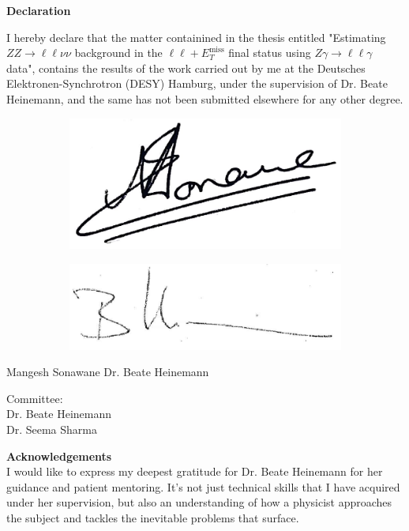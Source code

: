 \documentclass[12pt,a4paper,openright,twoside]{report}
\newcommand{\ZZ}{$ZZ\to \ell\ell\nu\nu$ }
\newcommand{\Zg}{$Z\gamma\to \ell\ell\gamma$ }
\newcommand{\llM}{$\ell\ell+E_T^{\mathrm{miss}}$ }
\newcommand\blankpage{%
    \null
    \thispagestyle{empty}%
    \addtocounter{page}{-1}%
    \newpage}
\begin{document}
\newpage
\blankpage
\newpage
\begin{center}
\Huge \textbf{Declaration\\}
\end{center}
\vspace{1cm}
\normalsize I hereby declare that the matter containined in the thesis entitled "Estimating \ZZ background in the \llM final status using \Zg data", contains the results of the work carried out by me at the Deutsches Elektronen-Synchrotron (DESY) Hamburg, under the supervision of Dr. Beate Heinemann, and the same has not been submitted elsewhere for any other degree.
\vfill
\begin{figure}[H]
	\hspace{1cm}
	\begin{subfigure}{0.49\textwidth}
	\includegraphics[width=0.4\linewidth]{sign.jpg}
	\end{subfigure}\hspace{1cm}
	\begin{subfigure}{0.49\textwidth}
	\centering
	\includegraphics[width=0.7\linewidth]{Beate_sign.jpg}
	\end{subfigure}
\end{figure}
\begin{center}
Mangesh Sonawane\hspace{8cm}
Dr. Beate Heinemann
\end{center}
\vfill
Committee:\\
Dr. Beate Heinemann\\
Dr. Seema Sharma
\vfill
\vfill
\newpage
\blankpage
\newpage
{\Huge \textbf{Acknowledgements\vspace{2cm}\\}}
I would like to express my deepest gratitude for Dr. Beate Heinemann for her guidance and patient mentoring. It's not just technical skills that I have acquired under her supervision, but also an understanding of how a physicist approaches the subject and tackles the inevitable problems that surface.
\end{document}
